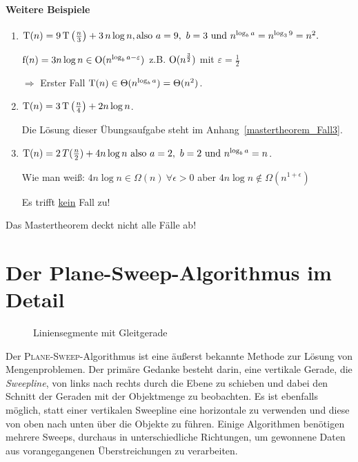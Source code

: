 \documentclass{scrreprt}%
\theoremstyle{break}
\begin{document}
\subsubsection{Weitere Beispiele}
\begin{enumerate}
\item \( \textup{T}(n) = 9 \, \textup{T}\left(\frac{n}{3}\right) + 3 \, n\log n, \textup{also}\ a = 9,\ b = 3\ 
\textup{und}\ n^{\log_ba} = n^{\log_39} = n^2.\)

\(\textup{f}(n) = 3n\log n \in \textup{O}(n^{\log_ba-\varepsilon}) \)
z.B. \(\textup{O}(n^{\frac{3}{2}})\) mit \( \varepsilon = \frac{1}{2} \)

\( \Rightarrow \) Erster Fall \( \textup{T}(n) \in \Theta(n^{\log_ba}) = \Theta (n^2) \).

\item \( \textup{T}(n) = 3 \, \textup{T}\left(\frac{n}{4}\right) + 2n\log n\).

Die Lösung dieser Übungsaufgabe steht im Anhang~\ref{mastertheorem_Fall3}.

\item \( \textup{T}(n) = 2 \, T(\frac{n}{2}) + 4n\log n\ \textup{also}\
a = 2,\ b = 2\ \textup{und}\ n^{\log_ba} = n \).

Wie man weiß: \(4n\log n \in \Omega(n)\ \forall \epsilon >0\) aber \(4n\log n \notin \Omega(n^{1+\epsilon})\)
	
Es trifft {\underline {kein}} Fall zu!
\end{enumerate}
Das Mastertheorem deckt nicht alle Fälle ab!
	

\appendix    %

\chapter{Der Plane-Sweep-Algorithmus im Detail}
\label{planesweep}

\begin{figure}
  \begin{center}  \end{center}
  \caption{Liniensegmente mit Gleitgerade}
  \label{131003d}
\end{figure}

Der \textsc{Plane-Sweep}-Algorithmus ist eine äußerst bekannte
Methode zur Lösung von Mengenproblemen. Der primäre Gedanke
besteht darin, eine vertikale Gerade, die \textit{Sweep\-line}, von
links nach rechts durch die Ebene zu schieben und dabei den
Schnitt der Geraden mit der Objektmenge zu beobachten. Es
ist ebenfalls möglich, statt einer vertikalen Sweepline eine
horizontale zu verwenden und diese von oben nach unten über die
Objekte zu führen. Einige Algorithmen benötigen mehrere Sweeps,
durchaus in unterschiedliche Richtungen, um gewonnene Daten aus
vorangegangenen Überstreich\-ungen zu verarbeiten.
\end{document}
